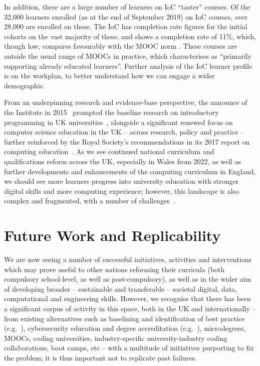 \documentclass[conference]{IEEEtran}
\begin{document}
In addition, there are a large number of learners on IoC ``taster''
courses. Of the 32,000 learners enrolled (as at the end of September 2019) on IoC
courses, over 28,000 are enrolled on these.  The IoC has completion
rate figures for the initial cohorts on the vast majority of these,
and shows a completion rate of 11\%, which, though low, compares
favourably with the MOOC norm \cite{ReichRuiperezValiente2019a}. These
courses are outside the usual range of MOOCs in practice, which
\cite{ReichRuiperezValiente2019a} characterises as ``primarily
supporting already educated learners''.  Further analysis of the IoC
learner profile is on the workplan, to better understand how we can
engage a wider demographic.

From an underpinning research and evidence-base perspective, the
announce of the Institute in 2015~\cite{HMG2015a} prompted the
baseline research on introductory programming in UK
universities~\cite{murphy-et-al:programming2017,simon-et-al:sigcse2018},
alongside a significant renewed focus on computer science education in
the UK -- across research, policy and practice -- further reinforced
by the Royal Society's recommendations in its 2017 report on computing
education~\cite{rs:2017}. As we see continued national curriculum and
qualifications reform across the UK, especially in Wales from 2022, as
well as further developments and enhancements of the computing
curriculum in England, we should see more learners progress into
university education with stronger digital skills and more computing
experience; however, this landscape is also complex and fragmented,
with a number of challenges~\cite{roehampton:2018}.

\section{Future Work and Replicability}\label{concl}

We are now seeing a number of successful initiatives, activities and
interventions which may prove useful to other nations reforming their
curricula (both compulsory school-level, as well as post-compulsory),
as well as in the wider aim of developing broader -- sustainable and
transferable -- societal digital, data, computational and engineering
skills. However, we recognise that there has been a significant corpus
of activity in this space, both in the UK and internationally -- from
existing alternatives such as baselining and identification of best
practice (e.g.~\cite{murphy-et-al:programming2017}), cybersecurity
education and degree accreditation (e.g.~\cite{crick-et-al:fie2019, itnowcyber:2019}),
microdegrees, MOOCs, coding universities, industry-specific
university-industry coding collaborations, boot camps, etc -- with a
multitude of initiatives purporting to fix the problem; it is thus
important not to replicate past failures.
\end{document}
